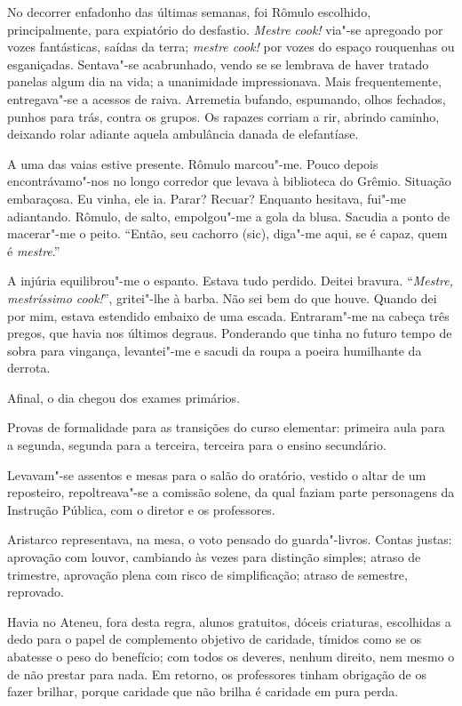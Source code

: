 No decorrer enfadonho das últimas semanas,
foi Rômulo escolhido, principalmente, para expiatório do desfastio.
\textit{Mestre cook!} via"-se apregoado por vozes fantásticas, saídas da terra;
\textit{mestre cook!} por vozes do espaço rouquenhas ou esganiçadas.
Sentava"-se acabrunhado, vendo se se lembrava de haver tratado panelas
algum dia na vida; a unanimidade impressionava. Mais frequentemente,
entregava"-se a acessos de raiva. Arremetia bufando, espumando, olhos
fechados, punhos para trás, contra os grupos. Os rapazes corriam a rir,
abrindo caminho, deixando rolar adiante aquela ambulância danada de
elefantíase. 

A uma das vaias estive presente. Rômulo marcou"-me. Pouco
depois encontrávamo"-nos no longo corredor que levava à biblioteca do
Grêmio. Situação embaraçosa. Eu vinha, ele ia. Parar? Recuar? Enquanto
hesitava, fui"-me adiantando. Rômulo, de salto, empolgou"-me a gola
da blusa. Sacudia a ponto de macerar"-me o peito. ``Então, seu cachorro
(sic), diga"-me aqui, se é capaz, quem é \textit{mestre}.'' 

A injúria equilibrou"-me o espanto. Estava tudo perdido. Deitei bravura.
``\textit{Mestre, mestríssimo cook!}'', gritei"-lhe à barba. Não sei bem do que
houve. Quando dei por mim, estava estendido embaixo de uma escada.
Entraram"-me na cabeça três pregos, que havia nos últimos degraus.
Ponderando que tinha no futuro tempo de sobra para vingança,
levantei"-me e sacudi da roupa a poeira humilhante da derrota. 

Afinal, o dia chegou dos exames primários. 

Provas de formalidade para as
transições do curso elementar: primeira aula para a segunda, segunda
para a terceira, terceira para o ensino secundário. 

Levavam"-se assentos e mesas para o salão do oratório, vestido o altar de um
reposteiro, repoltreava"-se a comissão solene, da qual faziam parte
personagens da Instrução Pública, com o diretor e os professores.

Aristarco representava, na mesa, o voto pensado do guarda"-livros.
Contas justas: aprovação com louvor, cambiando às vezes para distinção
simples; atraso de trimestre, aprovação plena com risco de
simplificação; atraso de semestre, reprovado. 

Havia no Ateneu, fora
desta regra, alunos gratuitos, dóceis criaturas, escolhidas a dedo para
o papel de complemento objetivo de caridade, tímidos como se os
abatesse o peso do benefício; com todos os deveres, nenhum direito, nem
mesmo o de não prestar para nada. Em retorno, os professores tinham
obrigação de os fazer brilhar, porque caridade que não brilha é
caridade em pura perda. 

